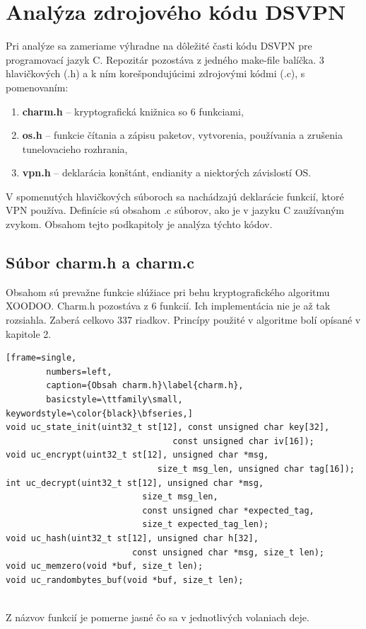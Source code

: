 \section{Analýza zdrojového kódu DSVPN}
Pri analýze sa zameriame výhradne na dôležité časti kódu DSVPN pre programovací jazyk C. Repozitár pozostáva z jedného make-file balíčka\cite{make}. 3 hlavičkových (.h) a k ním korešpondujúcimi zdrojovými kódmi (.c), s pomenovaním:
 \begin{enumerate}
 	\item \textbf{charm.h} -- kryptografická knižnica so 6 funkciami,
 	\item \textbf{os.h} -- funkcie čítania a zápisu paketov, vytvorenia, používania a zrušenia tunelovacieho rozhrania,
 	\item \textbf{vpn.h} -- deklarácia konštánt, endianity\cite{endianita} a niektorých závislostí OS.
 \end{enumerate}

V spomenutých hlavičkových súboroch sa nachádzajú deklarácie funkcií, ktoré VPN používa. Definície sú obsahom .c súborov, ako je v jazyku C zaužívaným zvykom. Obsahom tejto podkapitoly je analýza týchto kódov. 
 
\subsection{Súbor charm.h a charm.c}
Obsahom sú prevažne funkcie slúžiace pri behu kryptografického algoritmu XOODOO. Charm.h pozostáva z 6 funkcií. Ich implementácia nie je až tak rozsiahla. Zaberá celkovo 337 riadkov. Princípy použité v algoritme bolí opísané v kapitole 2.  
 
   \begin{minipage}{\linewidth} 	
  	\begin{lstlisting}[frame=single,
  		numbers=left,
  		caption={Obsah charm.h}\label{charm.h},
  		basicstyle=\ttfamily\small, keywordstyle=\color{black}\bfseries,]
void uc_state_init(uint32_t st[12], const unsigned char key[32], 
				  			 	 const unsigned char iv[16]);
void uc_encrypt(uint32_t st[12], unsigned char *msg, 
							  size_t msg_len, unsigned char tag[16]);	
int uc_decrypt(uint32_t st[12], unsigned char *msg, 
			   			   size_t msg_len,
			   			   const unsigned char *expected_tag, 
			   			   size_t expected_tag_len);
void uc_hash(uint32_t st[12], unsigned char h[32],
			 			 const unsigned char *msg, size_t len);
void uc_memzero(void *buf, size_t len);
void uc_randombytes_buf(void *buf, size_t len);
  		 	\end{lstlisting}
  	\end{minipage}\\
Z názvov funkcií je pomerne jasné čo sa v jednotlivých volaniach deje.   
